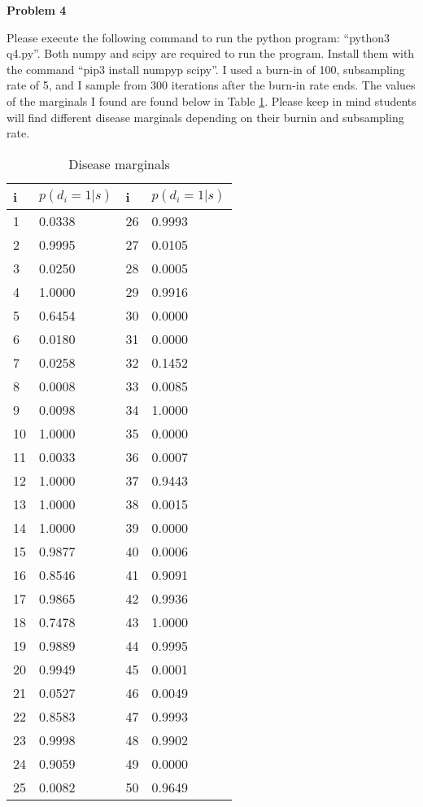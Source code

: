 \textbf{Problem 4}

Please execute the following command to run the python program: ``python3 q4.py''. Both numpy and scipy are required to run the program. Install them with the command ``pip3 install numpyp scipy''. I used a burn-in of 100, subsampling rate of 5, and I sample from 300 iterations after the burn-in rate ends. The values of the marginals I found are found below in Table \ref{disease-marginals}. Please keep in mind students will find different disease marginals depending on their burnin and subsampling rate.

\begin{table}[h]
	\centering
	\begin{tabular}{|l|l||l|l|}
		\hline
		i  & $p(d_i = 1 \vert s)$ & i  & $p(d_i = 1 \vert s)$ \\ \hline
		1 & 0.0338 & 26 & 0.9993 \\ \hline
		2 & 0.9995 & 27 & 0.0105 \\ \hline
		3 & 0.0250 & 28 & 0.0005 \\ \hline
		4 & 1.0000 & 29 & 0.9916 \\ \hline
		5 & 0.6454 & 30 & 0.0000 \\ \hline
		6 & 0.0180 & 31 & 0.0000 \\ \hline
		7 & 0.0258 & 32 & 0.1452 \\ \hline
		8 & 0.0008 & 33 & 0.0085 \\ \hline
		9 & 0.0098 & 34 & 1.0000 \\ \hline
		10 & 1.0000 & 35 & 0.0000 \\ \hline
		11 & 0.0033 & 36 & 0.0007 \\ \hline
		12 & 1.0000 & 37 & 0.9443 \\ \hline
		13 & 1.0000 & 38 & 0.0015 \\ \hline
		14 & 1.0000 & 39 & 0.0000 \\ \hline
		15 & 0.9877 & 40 & 0.0006 \\ \hline
		16 & 0.8546 & 41 & 0.9091 \\ \hline
		17 & 0.9865 & 42 & 0.9936 \\ \hline
		18 & 0.7478 & 43 & 1.0000 \\ \hline
		19 & 0.9889 & 44 & 0.9995 \\ \hline
		20 & 0.9949 & 45 & 0.0001 \\ \hline
		21 & 0.0527 & 46 & 0.0049 \\ \hline
		22 & 0.8583 & 47 & 0.9993 \\ \hline
		23 & 0.9998 & 48 & 0.9902 \\ \hline
		24 & 0.9059 & 49 & 0.0000 \\ \hline
		25 & 0.0082 & 50 & 0.9649 \\ \hline
	\end{tabular}
	\caption{Disease marginals}
	\label{disease-marginals}
\end{table}

